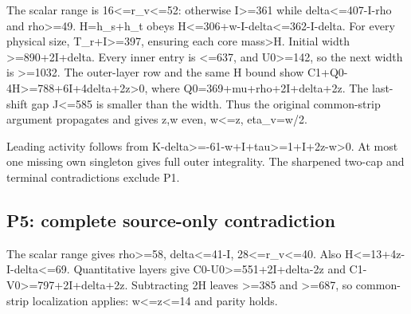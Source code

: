 \documentclass[10pt,a4paper]{article}
\theoremstyle{definition}
\begin{document}
The scalar range is 16\textless=\allowbreak{}r\_\allowbreak{}v\textless=\allowbreak{}52: otherwise
I\textgreater=\allowbreak{}361 while delta\textless=\allowbreak{}407-I-rho and rho\textgreater=\allowbreak{}49.
H=\allowbreak{}h\_\allowbreak{}s+\allowbreak{}h\_\allowbreak{}t obeys H\textless=\allowbreak{}306+\allowbreak{}w-I-delta\textless=\allowbreak{}362-I-delta. For
every physical size,\allowbreak{} T\_\allowbreak{}r+\allowbreak{}I\textgreater=\allowbreak{}397,\allowbreak{} ensuring each core
mass\textgreater H. Initial width \textgreater=\allowbreak{}890+\allowbreak{}2I+\allowbreak{}delta. Every inner
entry is \textless=\allowbreak{}637,\allowbreak{} and U0\textgreater=\allowbreak{}142,\allowbreak{} so the next width is
\textgreater=\allowbreak{}1032. The outer-layer row and the same H bound show
C1+\allowbreak{}Q0-4H\textgreater=\allowbreak{}788+\allowbreak{}6I+\allowbreak{}4delta+\allowbreak{}2z\textgreater0,\allowbreak{} where
Q0=\allowbreak{}369+\allowbreak{}mu+\allowbreak{}rho+\allowbreak{}2I+\allowbreak{}delta+\allowbreak{}2z. The last-shift gap J\textless=\allowbreak{}585 is smaller
than the width. Thus the original common-strip argument propagates and
gives z,\allowbreak{}w even,\allowbreak{} w\textless=\allowbreak{}z,\allowbreak{} eta\_\allowbreak{}v=\allowbreak{}w/2.

Leading activity follows from
K-delta\textgreater=\allowbreak{}-61-w+\allowbreak{}I+\allowbreak{}tau\textgreater=\allowbreak{}1+\allowbreak{}I+\allowbreak{}2z-w\textgreater0. At
most one missing own singleton gives full outer integrality. The
sharpened two-cap and terminal contradictions exclude P1.

\hypertarget{p5-complete-source-only-contradiction}{%
\subsection{P5: complete source-only
contradiction}\label{p5-complete-source-only-contradiction}}

The scalar range gives rho\textgreater=\allowbreak{}58,\allowbreak{} delta\textless=\allowbreak{}41-I,\allowbreak{}
28\textless=\allowbreak{}r\_\allowbreak{}v\textless=\allowbreak{}40. Also H\textless=\allowbreak{}13+\allowbreak{}4z-I-delta\textless=\allowbreak{}69.
Quantitative layers give C0-U0\textgreater=\allowbreak{}551+\allowbreak{}2I+\allowbreak{}delta-2z and
C1-V0\textgreater=\allowbreak{}797+\allowbreak{}2I+\allowbreak{}delta+\allowbreak{}2z. Subtracting 2H leaves
\textgreater=\allowbreak{}385 and \textgreater=\allowbreak{}687,\allowbreak{} so common-strip localization
applies: w\textless=\allowbreak{}z\textless=\allowbreak{}14 and parity holds.
\end{document}
